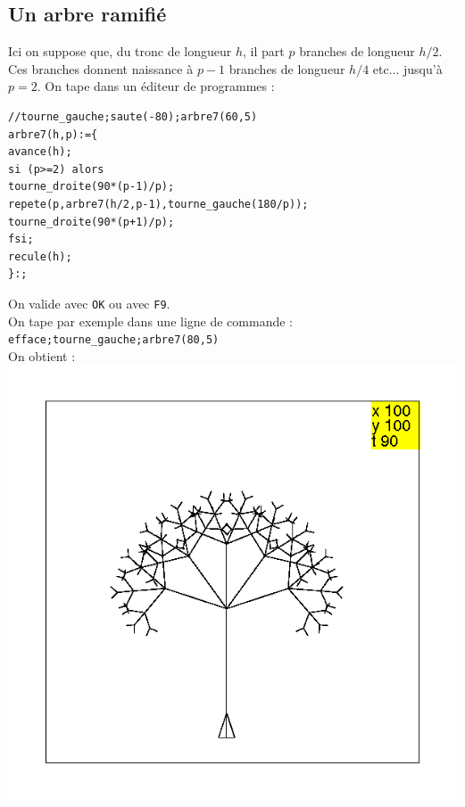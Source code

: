 \documentclass[a4paper,11pt]{book}
\begin{document}
\subsection{Un arbre ramifi\'e}
Ici on suppose que, du tronc de longueur $h$,
 il part $p$ branches de longueur $h/2$.
Ces branches donnent naissance \`a $p-1$ branches de longueur $h/4$ etc...
jusqu'\`a $p=2$.
On tape dans un \'editeur de programmes :
\begin{verbatim}
//tourne_gauche;saute(-80);arbre7(60,5)
arbre7(h,p):={
avance(h);
si (p>=2) alors
tourne_droite(90*(p-1)/p);
repete(p,arbre7(h/2,p-1),tourne_gauche(180/p));
tourne_droite(90*(p+1)/p);
fsi;
recule(h);
}:;
\end{verbatim}
On valide avec {\tt OK} ou avec {\tt F9}.\\
On tape par exemple dans une ligne de commande :\\
{\tt efface;tourne\_gauche;arbre7(80,5)}\\
On obtient :\\
\includegraphics[width=\textwidth]{tortarb7}\\

%
\end{document}
